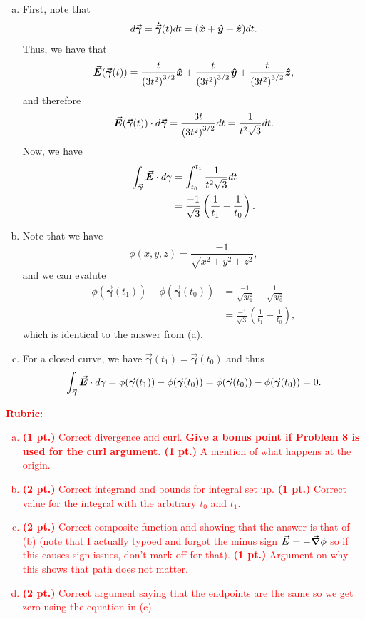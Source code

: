 \documentclass[12pt]{article} %
\newcommand{\curvegamma}{\boldsymbol{\vec{\gamma}}}
\newcommand{\tangentgamma}{\boldsymbol{\dot{\vec{\gamma}}}}
\begin{document}
\begin{solution}
\begin{enumerate}[(a)]
    \item First, note that
    \[
    d\curvegamma = \tangentgamma(t) dt = (\xhat + \yhat + \zhat)dt.
    \]
    Thus, we have that
    \[
    \vecfieldE(\curvegamma(t))= \frac{t}{\left(3t^2\right)^{3/2}} \xhat + \frac{t}{\left(3t^2\right)^{3/2}} \yhat + \frac{t}{\left(3t^2\right)^{3/2}} \zhat,
    \]
    and therefore
    \[
    \vecfieldE(\curvegamma(t)) \cdot d\curvegamma = \frac{3t}{\left(3t^2\right)^{3/2}}dt = \frac{1}{t^2\sqrt{3}}dt.
    \]
    Now, we have
    \begin{align*}
        \int_{\curvegamma} \vecfieldE \cdot d\gamma &= \int_{t_0}^{t_1} \frac{1}{t^2\sqrt{3}}dt\\
        &= \frac{-1}{\sqrt{3}}\left(\frac{1}{t_1} - \frac{1}{t_0}\right).
    \end{align*}
    \item Note that we have
    \[
    \phi(x,y,z) = \frac{-1}{\sqrt{x^2+y^2+z^2}},
    \]
    and we can evalute
    \begin{align*}
        \phi(\curvegamma(t_1))-\phi(\curvegamma(t_0)) &= \frac{-1}{\sqrt{3t_1^2}}-\frac{1}{\sqrt{3t_0^2}}\\
        &= \frac{-1}{\sqrt{3}} \left(\frac{1}{t_1}-\frac{1}{t_0}\right),
    \end{align*}
    which is identical to the answer from (a).
    \item For a closed curve, we have $\curvegamma(t_1)=\curvegamma(t_0)$ and thus
    \[
    \int_{\curvegamma} \vecfieldE \cdot d\gamma = \phi(\curvegamma(t_1))-\phi(\curvegamma(t_0)) = \phi(\curvegamma(t_0))-\phi(\curvegamma(t_0))=0.
    \]
\end{enumerate}
\end{solution}
\vspace*{1cm}
\textcolor{red}{
\noindent \textbf{Rubric:}
\begin{enumerate}[(a)]
    \item \textbf{(1 pt.)} Correct divergence and curl. \textbf{Give a bonus point if Problem 8 is used for the curl argument.} \textbf{(1 pt.)} A mention of what happens at the origin.
	\item \textbf{(2 pt.)} Correct integrand and bounds for integral set up. \textbf{(1 pt.)} Correct value for the integral with the arbitrary $t_0$ and $t_1$.
	\item \textbf{(2 pt.)} Correct composite function and showing that the answer is that of (b) (note that I actually typoed and forgot the minus sign $\boldsymbol{\vec{E}}= -\boldsymbol{\vec{\nabla}} \phi$ so if this causes sign issues, don't mark off for that). \textbf{(1 pt.)} Argument on why this shows that path does not matter.
	\item \textbf{(2 pt.)} Correct argument saying that the endpoints are the same so we get zero using the equation in (c).
\end{enumerate}
}
\end{document}
